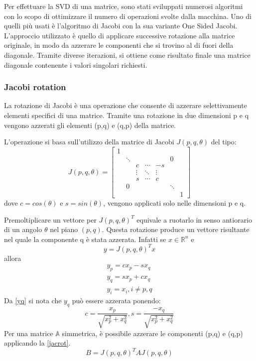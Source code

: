 Per effettuare la SVD di una matrice, sono stati sviluppati numerosi algoritmi con lo scopo di ottimizzare il numero di operazioni svolte dalla macchina.
Uno di quelli più usati è l'algoritmo di Jacobi con la sua variante One Sided Jacobi. L'approccio utilizzato è quello di applicare successive rotazione alla matrice originale, in modo da azzerare le componenti che si trovino al di fuori della diagonale. Tramite diverse iterazioni, si ottiene come risultato finale una matrice diagonale contenente i valori singolari richiesti.
\subsubsection{Jacobi rotation}
La rotazione di Jacobi è una operazione che consente di azzerare selettivamente elementi specifici di una matrice. Tramite una rotazione in due dimensioni p e q vengono azzerati gli elementi (p,q) e (q,p) della matrice.

L'operazione si basa sull'utilizzo della matrice di Jacobi $J(p,q,\theta)$ del tipo:
\[
J(p,q,\theta)=\begin{bmatrix}
1 &  &  &  &  &  & \\
 & \ddots &  &  &  & 0 & \\
 &  & c & \cdots & -s &  & \\
 &  & \vdots & \ddots & \vdots &  & \\
 &  & s & \cdots & c &  & \\
 & 0 &  &  &  & \ddots & \\
 &  &  &  &  &  & 1
\end{bmatrix}
\]
dove $c=cos(\theta)$ e $s=sin(\theta)$, vengono applicati solo nelle dimensioni p e q.

Premoltiplicare un vettore per $J(p,q,\theta)^T$ equivale a ruotarlo in senso antiorario di un angolo $\theta$ nel piano $(p,q)$. Questa rotazione produce un vettore risultante nel quale la componente q è stata azzerata. Infatti se $x\in\mathbb{R}^{n}$ e
\begin{equation}
y=J(p,q,\theta)^Tx
\end{equation}
allora
\begin{eqnarray}
y_p=cx_p-sx_q\\
y_q=sx_p+cx_q\label{yq}\\
y_i=x_i, i\neq p,q
\end{eqnarray}
Da \ref{yq} si nota che $y_q$ può essere azzerata ponendo:
\begin{equation}
c=\frac{x_p}{\sqrt{x_p^2+x_q^2}},s=\frac{-x_q}{\sqrt{x_p^2+x_q^2}}
\end{equation}
Per una matrice $\mathbb{A}$ simmetrica, è possibile azzerare le componenti (p,q) e (q,p) applicando la \ref{jacrot}.
\begin{equation}
B=J(p,q,\theta)^TAJ(p,q,\theta)\label{jacrot}
\end{equation}













